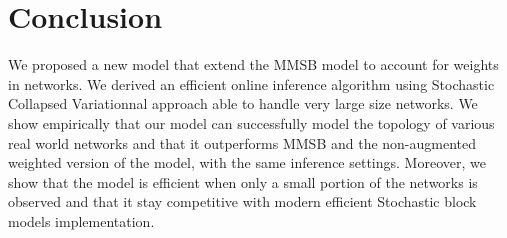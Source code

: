 \section{Conclusion}
\label{sec:concl}

We proposed a new model that extend the MMSB model to account for weights in networks. We derived an efficient online inference algorithm using Stochastic Collapsed Variationnal approach able to handle very  large size networks. We show empirically that our model can successfully model the topology of various real world networks and that it outperforms MMSB and the non-augmented weighted version of the model, with the same inference settings. Moreover, we show that the model is efficient when only a  small portion of the networks is observed and that it stay competitive with modern efficient Stochastic block models implementation.

